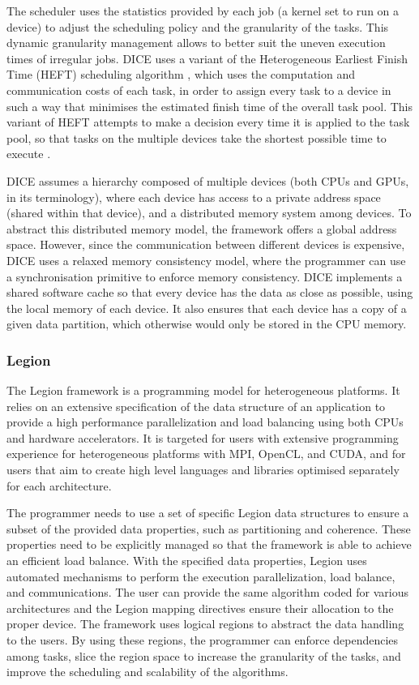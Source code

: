 The scheduler uses the statistics provided by each job (a kernel set to run on a device) to adjust the scheduling policy and the granularity of the tasks. This dynamic granularity management allows to better suit the uneven execution times of irregular jobs. DICE uses a variant of the Heterogeneous Earliest Finish Time (HEFT) scheduling algorithm \cite{HEFT}, which uses the computation and communication costs of each task, in order to assign every task to a device in such a way that minimises the estimated finish time of the overall task pool. This variant of HEFT attempts to make a decision every time it is applied to the task pool, so that tasks on the multiple devices take the shortest possible time to execute \cite{Msc:Mariano}.

DICE assumes a hierarchy composed of multiple devices (both CPUs and GPUs, in its terminology), where each device has access to a private address space (shared within that device), and a distributed memory system among devices. To abstract this distributed memory model, the framework offers a global address space. However, since the communication between different devices is expensive, DICE uses a relaxed memory consistency model, where the programmer can use a synchronisation primitive to enforce memory consistency. DICE implements a shared software cache so that every device has the data as close as possible, using the local memory of each device. It also ensures that each device has a copy of a given data partition, which otherwise would only be stored in the CPU memory.

\subsubsection*{Legion}

The Legion framework \cite{Legion} is a programming model for heterogeneous platforms. It relies on an extensive specification of the data structure of an application to provide a high performance parallelization and load balancing using both CPUs and hardware accelerators. It is targeted for users with extensive programming experience for heterogeneous platforms with MPI, OpenCL, and CUDA, and for users that aim to create high level languages and libraries optimised separately for each architecture.

The programmer needs to use a set of specific Legion data structures to ensure a subset of the provided data properties, such as partitioning and coherence. These properties need to be explicitly managed so that the framework is able to achieve an efficient load balance. With the specified data properties, Legion uses automated mechanisms to perform the execution parallelization, load balance, and communications. The user can provide the same algorithm coded for various architectures and the Legion mapping directives ensure their allocation to the proper device. The framework uses logical regions to abstract the data handling to the users. By using these regions, the programmer can enforce dependencies among tasks, slice the region space to increase the granularity of the tasks, and improve the scheduling and scalability of the algorithms.

